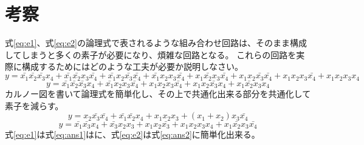 \documentclass[dvipdfmx]{jsarticle}
\begin{document}
	\section{考察}
		式\ref{eq:e1}、式\ref{eq:e2}の論理式で表されるような組み合わせ回路は、そのまま構成してしまうと多くの素子が必要になり、煩雑な回路となる。
		これらの回路を実際に構成するためにはどのような工夫が必要か説明しなさい。
		\begin{equation}
			\label{eq:e1}
			y = \bar{x_1} \bar{x_2} \bar{x_3} x_4 + \bar{x_1} \bar{x_2} x_3 \bar{x_4} + \bar{x_1} x_2 \bar{x_3} \bar{x_4} + \bar{x_1} x_2 x_3 \bar{x_4} +
				x_1 \bar{x_2} x_3 \bar{x_4} + x_1 x_2 \bar{x_3} \bar{x_4} + x_1 x_2 x_3 \bar{x_4} + x_1 x_2 x_3 x_4
		\end{equation}
		\begin{equation}
			\label{eq:e2}
			y = \bar{x_1} \bar{x_2} \bar{x_3} x_4 + \bar{x_1} x_2 x_3 \bar{x_4} + x_1 x_2 x_3 \bar{x_4} + x_1 x_2 \bar{x_3} x_4 + x_1 \bar{x_2} x_3 x_4
		\end{equation}
		カルノー図を書いて論理式を簡単化し、その上で共通化出来る部分を共通化して素子を減らす。
		\begin{equation}
			\label{eq:ans1}
			y = x_2 \bar{x_3} \bar{x_4} + \bar{x_1} \bar{x_2} x_4 + x_1 x_2 x_3 + (x_1 + x_2) x_3 \bar{x_4}
		\end{equation}
		\begin{equation}
			\label{eq:ans2}
			y = \bar{x_1} \bar{x_3} x_4 + \bar{x_3} x_2 x_3 + x_1 x_2 \bar{x_3} + x_1 x_2 x_3 x_4 + x_1 \bar{x_2} x_3 \bar{x_4}
		\end{equation}
		式\ref{eq:e1}は式\ref{eq:ans1}はに、式\ref{eq:e2}は式\ref{eq:ans2}に簡単化出来る。
\end{document}
